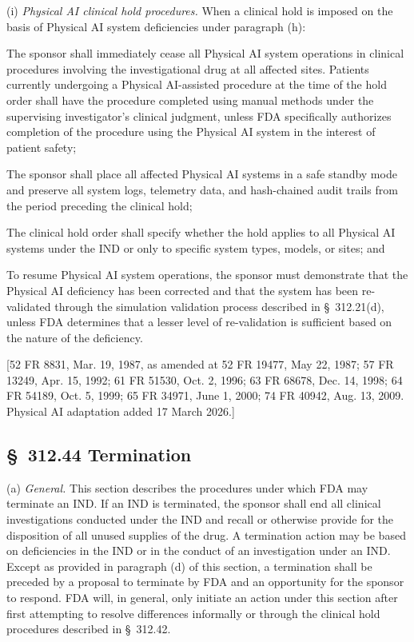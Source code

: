 (i) \textit{Physical AI clinical hold procedures.} When a clinical hold is imposed on the basis of Physical AI system deficiencies under paragraph (h):

\begin{description}[leftmargin=0.8cm,style=sameline]
\item[(i)] The sponsor shall immediately cease all Physical AI system operations in clinical procedures involving the investigational drug at all affected sites. Patients currently undergoing a Physical AI-assisted procedure at the time of the hold order shall have the procedure completed using manual methods under the supervising investigator's clinical judgment, unless FDA specifically authorizes completion of the procedure using the Physical AI system in the interest of patient safety;
\item[(ii)] The sponsor shall place all affected Physical AI systems in a safe standby mode and preserve all system logs, telemetry data, and hash-chained audit trails from the period preceding the clinical hold;
\item[(iii)] The clinical hold order shall specify whether the hold applies to all Physical AI systems under the IND or only to specific system types, models, or sites; and
\item[(iv)] To resume Physical AI system operations, the sponsor must demonstrate that the Physical AI deficiency has been corrected and that the system has been re-validated through the simulation validation process described in \S~312.21(d), unless FDA determines that a lesser level of re-validation is sufficient based on the nature of the deficiency.
\end{description}

[52 FR 8831, Mar. 19, 1987, as amended at 52 FR 19477, May 22, 1987; 57 FR 13249, Apr. 15, 1992; 61 FR 51530, Oct. 2, 1996; 63 FR 68678, Dec. 14, 1998; 64 FR 54189, Oct. 5, 1999; 65 FR 34971, June 1, 2000; 74 FR 40942, Aug. 13, 2009. Physical AI adaptation added 17 March 2026.]

\subsection{\S~312.44 Termination}

(a) \textit{General.} This section describes the procedures under which FDA may terminate an IND. If an IND is terminated, the sponsor shall end all clinical investigations conducted under the IND and recall or otherwise provide for the disposition of all unused supplies of the drug. A termination action may be based on deficiencies in the IND or in the conduct of an investigation under an IND. Except as provided in paragraph (d) of this section, a termination shall be preceded by a proposal to terminate by FDA and an opportunity for the sponsor to respond. FDA will, in general, only initiate an action under this section after first attempting to resolve differences informally or through the clinical hold procedures described in \S~312.42.

